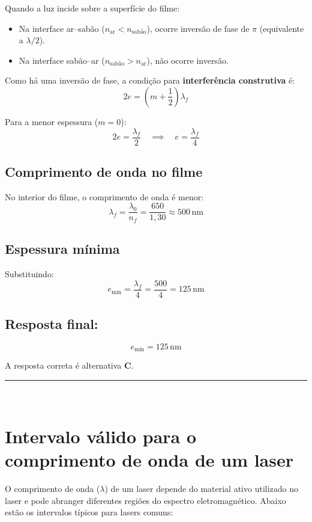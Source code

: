 \begin{flushleft}
Quando a luz incide sobre a superfície do filme:
\begin{itemize}
    \item Na interface ar–sabão (\(n_\text{ar} < n_\text{sabão}\)), ocorre inversão de fase de \(\pi\) (equivalente a \(\lambda/2\)).
    \item Na interface sabão–ar (\(n_\text{sabão} > n_\text{ar}\)), não ocorre inversão.
\end{itemize}

Como há uma inversão de fase, a condição para \textbf{interferência construtiva} é:
\[
2e = \left(m + \frac{1}{2}\right) \lambda_f
\]

Para a menor espessura (\(m = 0\)):
\[
2e = \frac{\lambda_f}{2} \quad \implies \quad e = \frac{\lambda_f}{4}
\]

\subsection*{Comprimento de onda no filme}

No interior do filme, o comprimento de onda é menor:
\[
\lambda_f = \frac{\lambda_0}{n_f} = \frac{650}{1{,}30} \approx 500\,\mathrm{nm}
\]

\subsection*{Espessura mínima}

Substituindo:
\[
e_\text{mín} = \frac{\lambda_f}{4} = \frac{500}{4} = 125\,\mathrm{nm}
\]

\subsection*{Resposta final:}
\[
\boxed{e_\text{mín} = 125\,\mathrm{nm}}
\]


A resposta correta é alternativa \colorbox{green!50}{\textbf{C}}.
\end{flushleft}

\noindent\rule{\linewidth}{0.6pt}\\

\section*{Intervalo válido para o comprimento de onda de um laser}

O comprimento de onda (\( \lambda \)) de um laser depende do material ativo utilizado no laser e pode abranger diferentes regiões do espectro eletromagnético. Abaixo estão os intervalos típicos para lasers comuns:

